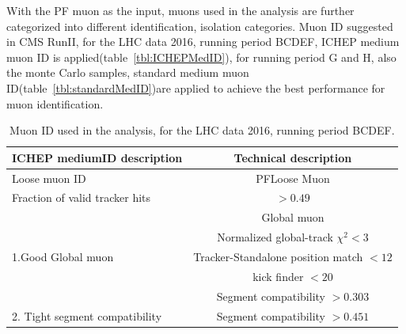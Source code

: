 With the PF muon as the input, muons used in the analysis are further categorized into different identification, isolation categories. Muon ID suggested in CMS RunII, for the LHC data 2016, running period BCDEF, ICHEP medium muon ID is applied(table~\ref{tbl:ICHEPMedID}), for running period G and H, also the monte Carlo samples, standard medium muon ID(table~\ref{tbl:standardMedID})are applied to achieve the best performance for muon identification. 






\begin{table}[!tpb]
\caption{Muon ID used in the analysis, for the LHC data 2016, running period BCDEF.  \label{tbl:ICHEPMedID}}
\label{tab:antil}
\begin{center}
\begin{tabular}{|l|c|}   
\hline
ICHEP mediumID description                    &  Technical description\\\hline
Loose muon ID                               & PFLoose Muon\\\hline
Fraction of valid tracker hits           & $>0.49$ \\\hline
\multirow{5}{*}{1.Good Global muon}                      &Global muon\\\cline{2-2}
                                                                        &Normalized global-track $\chi^{2}<3$\\\cline{2-2}
                                                                        &Tracker-Standalone position match $< 12$\\\cline{2-2}
                                                                        &kick finder $< 20$ \\\cline{2-2}
                                                                        &Segment compatibility $> 0.303$ \\\hline                                                                       
\hline
2. Tight segment compatibility      & Segment compatibility $>0.451$\\\hline
\end{tabular}
\end{center}
\end{table}


